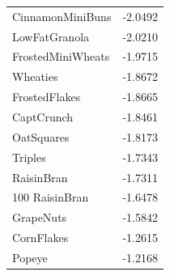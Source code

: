\begin{table}[!htbp]
\begin{tabular}{lr}
CinnamonMiniBuns & -2.0492 \\
LowFatGranola & -2.0210 \\
FrostedMiniWheats & -1.9715 \\
Wheaties & -1.8672 \\
FrostedFlakes & -1.8665 \\
CaptCrunch & -1.8461 \\
OatSquares & -1.8173 \\
Triples & -1.7343 \\
RaisinBran & -1.7311 \\
100%
RaisinBran & -1.6478 \\
GrapeNuts & -1.5842 \\
CornFlakes & -1.2615 \\
Popeye & -1.2168 \\
\bottomrule
\end{tabular}

\end{table}
